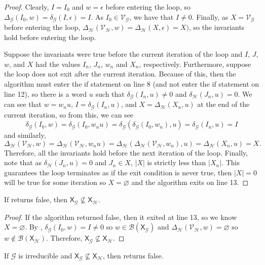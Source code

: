 \documentclass[hidelinks]{article}
\newcommand{\Gc}{\mathcal{G}}  %
\newcommand{\Hc}{\mathcal{H}}  %
\newcommand{\Vc}{\mathcal{V}}
\newcommand{\Bc}{\mathcal{B}}
\newcommand{\shift}[1]{\mathsf{X}_{#1}}
\theoremstyle{definition}
\begin{document}
\begin{proof}
    Clearly, \(I = I_0\) and \(w = \epsilon\) before entering the loop, so \(\Delta_\Gc(I_0, w) = \delta_\Gc(I, \epsilon) = I\).
    As \(I_0 \in \Vc_\Gc\), we have that \(I \neq 0\). Finally, as \(X = \Vc_\Gc\) before 
    entering the loop, \(\Delta_\Hc(\Vc_\Hc, w) = \Delta_\Hc(X, \epsilon) = X)\), so the invariants hold 
    before entering the loop.

    Suppose the invariants were true before the current iteration of the loop and \(I\), \(J\), \(w\), and \(X\)
    had the values \(I_n\), \(J_n\), \(w_n\) and \(X_n\), respectively. Furthermore, suppose the loop does not exit
    after the current iteration. Because of this, then the algorithm must enter the 
    if statement on line 8 (and not enter the if statement on line 12), so there is a word \(u\) such that \(\delta_\Gc(I_n, u) \neq 0\)
    and \(\delta_\Hc(J_n, u) = 0\). We can see that \(w = w_n u\), \(I = \delta_\Gc(I_n, u)\), and 
    \(X = \Delta_\Hc(X_n, u)\) at the end of the current iteration, so from this, we can see 
    \[\delta_\Gc(I_0, w) = \delta_\Gc(I_0, w_n u) = \delta_\Gc(\delta_\Gc(I_0, w_n), u) = \delta_\Gc(I_n, u) = I\]
    and similarly,
    \[\Delta_\Hc(\Vc_\Hc, w) = \Delta_\Hc(\Vc_\Hc, w_n u) = \Delta_\Hc(\Delta_\Hc(\Vc_\Hc, w_n), u) = \Delta_\Hc(X_n, u) = X.\]
    Therefore, all the invariants hold before the next iteration of the loop.
    Finally, note that as \(\delta_\Hc(J_n, u) = 0\) and \(J_n \in X\), \(|X|\) is strictly less 
    than \(|X_n|\). This guarantees the loop terminates as if the exit condition is never 
    true, then \(|X| = 0\) will be true for some iteration so \(X = \varnothing\) and the algorithm exits on line 13. 
\end{proof}

\begin{theorem}
    If  returns false, then \(\shift{\Gc} \nsubseteq \shift{\Hc}\).
\end{theorem}

\begin{proof}
    If the algorithm returned false, then it exited at line 13, so we 
    know \(X = \varnothing\). By , \(\delta_\Gc(I_0, w) = I \neq 0\) so 
    \(w \in \Bc(\shift{\Gc})\) and \(\Delta_\Hc(\Vc_\Hc, w) = \varnothing\) so \(w \notin \Bc(\shift{\Hc})\).
    Therefore, \(\shift{\Gc} \nsubseteq \shift{\Hc}\). 
\end{proof}

\begin{theorem}
    If \(\Gc\) is irreducible and \(\shift{\Gc} \nsubseteq \shift{\Hc}\), then  returns 
    false. 
\end{theorem}
\end{document}
